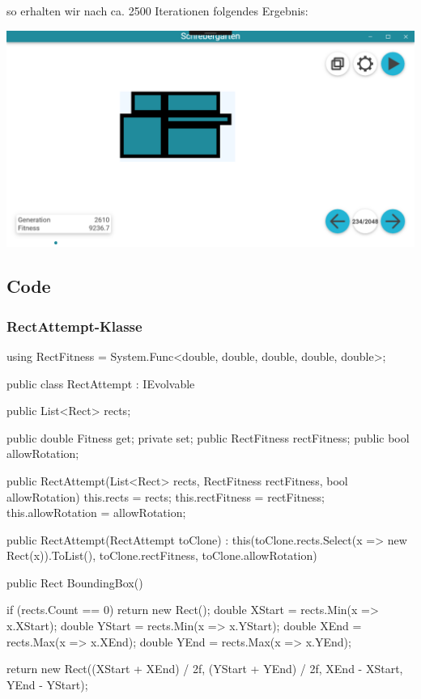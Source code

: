 \documentclass{article}
\newcommand{\q}[1]{\textbf{#1}}
\begin{document}
\begin{flushleft}
so erhalten wir nach ca. 2500 Iterationen folgendes Ergebnis: 
\begin{center}
\includegraphics[scale=.5]{schreberresults}
\end{center}

\newpage
\subsection{Code}

\subsubsection{\q{RectAttempt}-Klasse}
\begin{Csharp}
using RectFitness = System.Func<double, double, double, double, double>;

public class RectAttempt : IEvolvable
{
    public List<Rect> rects;

    public double Fitness { get; private set; }
    public RectFitness rectFitness;
    public bool allowRotation;

    public RectAttempt(List<Rect> rects, RectFitness rectFitness, bool allowRotation)
    {
        this.rects = rects;
        this.rectFitness = rectFitness;
        this.allowRotation = allowRotation;
    }
    
    public RectAttempt(RectAttempt toClone) : 
    	this(toClone.rects.Select(x => new Rect(x)).ToList(),
    	toClone.rectFitness,
    	toClone.allowRotation)
    { }

    public Rect BoundingBox()
    {
        if (rects.Count == 0) return new Rect();
        double XStart = rects.Min(x => x.XStart);
        double YStart = rects.Min(x => x.YStart);
        double XEnd   = rects.Max(x => x.XEnd);
        double YEnd   = rects.Max(x => x.YEnd);

        return new Rect((XStart + XEnd) / 2f, (YStart + YEnd) / 2f, XEnd - XStart, YEnd - YStart);
    }

}
\end{Csharp}
\end{flushleft}
\end{document}
